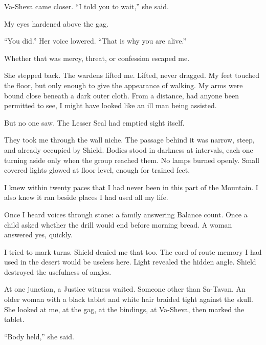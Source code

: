 Va-Sheva came closer. ``I told you to wait,'' she said.\par

My eyes hardened above the gag.\par

``You did.'' Her voice lowered. ``That is why you are alive.''\par

Whether that was mercy, threat, or confession escaped me.\par

She stepped back. The wardens lifted me. Lifted, never dragged. My feet touched the floor, but only enough to give the appearance of walking. My arms were bound close beneath a dark outer cloth. From a distance, had anyone been permitted to see, I might have looked like an ill man being assisted.\par

But no one saw. The Lesser Seal had emptied sight itself.\par

They took me through the wall niche. The passage behind it was narrow, steep, and already occupied by Shield. Bodies stood in darkness at intervals, each one turning aside only when the group reached them. No lamps burned openly. Small covered lights glowed at floor level, enough for trained feet.\par

I knew within twenty paces that I had never been in this part of the Mountain. I also knew it ran beside places I had used all my life.\par

Once I heard voices through stone: a family answering Balance count. Once a child asked whether the drill would end before morning bread. A woman answered yes, quickly.\par

I tried to mark turns. Shield denied me that too. The cord of route memory I had used in the desert would be useless here. Light revealed the hidden angle. Shield destroyed the usefulness of angles.\par

At one junction, a Justice witness waited. Someone other than Sa-Tavan. An older woman with a black tablet and white hair braided tight against the skull. She looked at me, at the gag, at the bindings, at Va-Sheva, then marked the tablet.\par

``Body held,'' she said.\par

